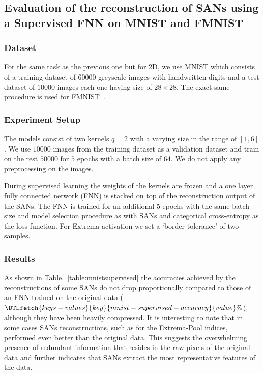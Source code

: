 \documentclass[journal]{IEEEtran}
\begin{document}
\subsection{Evaluation of the reconstruction of SANs using a Supervised FNN on MNIST and FMNIST}
\subsubsection{Dataset}
For the same task as the previous one but for 2D, we use MNIST which consists of a training dataset of $60000$ greyscale images with handwritten digits and a test dataset of $10000$ images each one having size of $28\times 28$.
The exact same procedure is used for FMNIST~\cite{xiao2017fashion}.

\subsubsection{Experiment Setup}
The models consist of two kernels $q=2$ with a varying size in the range of $[1, 6]$.
We use $10000$ images from the training dataset as a validation dataset and train on the rest $50000$ for $5$ epochs with a batch size of $64$.
We do not apply any preprocessing on the images.

During supervised learning the weights of the kernels are frozen and a one layer fully connected network (FNN) is stacked on top of the reconstruction output of the SANs.
The FNN is trained for an additional $5$ epochs with the same batch size and model selection procedure as with SANs and categorical cross-entropy as the loss function.
For Extrema activation we set a `border tolerance' of two samples.

\subsubsection{Results}
As shown in Table.~\ref{table:mnistsupervised} the accuracies achieved by the reconstructions of some SANs do not drop proportionally compared to those of an FNN trained on the original data ($\DTLfetch{keys-values}{key}{mnist-supervised-accuracy}{value}\%$), although they have been heavily compressed.
It is interesting to note that in some cases SANs reconstructions, such as for the Extrema-Pool indices, performed even better than the original data.
This suggests the overwhelming presence of redundant information that resides in the raw pixels of the original data and further indicates that SANs extract the most representative features of the data.
\end{document}
